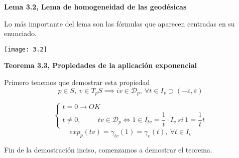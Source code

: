 \documentclass[openany]{book}
\begin{document}
\begin{center}
\textbf{Lema 3.2, Lema de homogeneidad de las geodésicas}
\end{center}
  Lo más importante del lema son las fórmulas que aparecen centradas en su enunciado.

\texttt{[image: 3.2]}
\newpage
\begin{center}
\textbf{Teorema 3.3, Propiedades de la aplicación exponencial}
\end{center}

Primero tenemos que demostrar esta propiedad
$$ p \in S, \ v \in T_pS \implies  iv \in \mathcal{D} _p, \ \forall t \in I_v \supset (- \varepsilon , \varepsilon ) $$
\begin{demonstration}
  $$ \left\{ \begin{array}{l}
    t=0 \to OK\\
    t \ne 0, \hspace{1cm} tv \in \mathcal{D}_p \iff 1 \in I_{tv} = \dfrac{1}{t} \cdot I_v\ si\ 1=\dfrac{1}{t}t
  \end{array} \right. $$
  $$ exp_p(tv) = \gamma _{tv}(1) = \gamma _v (t) , \ \forall t \in I_v $$
\end{demonstration}
Fin de la demostración inciso, comenzamos a demostrar el teorema.
\end{document}
